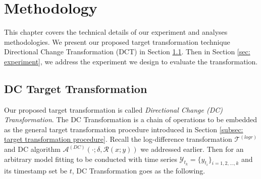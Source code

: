 \chapter{Methodology}\label{ch: methodology}
This chapter covers the technical details of our experiment and analyses methodologies. We present our proposed target transformation technique Directional Change Transformation (DCT) in Section \ref{sec: dc transformation}. Then in Section \ref{sec: experiment}, we address the experiment we design to evaluate the transformation.

\section{DC Target Transformation}\label{sec: dc transformation}
Our proposed target transformation is called \textit{Directional Change (DC) Transformation}. The DC Transformation is a chain of operations to be embedded as the general target transformation procedure introduced in Section \ref{subsec: target transformation procedure}. Recall the log-difference transformation $\mathcal{T}^{(logr)}$ and DC algorithm $\mathcal{A}^{(DC)} (\cdot; \delta, \mathcal{R} (x; y))$ we addressed earlier. Then for an arbitrary model fitting to be conducted with time series $\mathcal{Y}_{t_k} = \{y_{t_i}\}_{i = 1, 2, \ldots, k}$ and its timestamp set be $t$, DC Transformation goes as the following.

